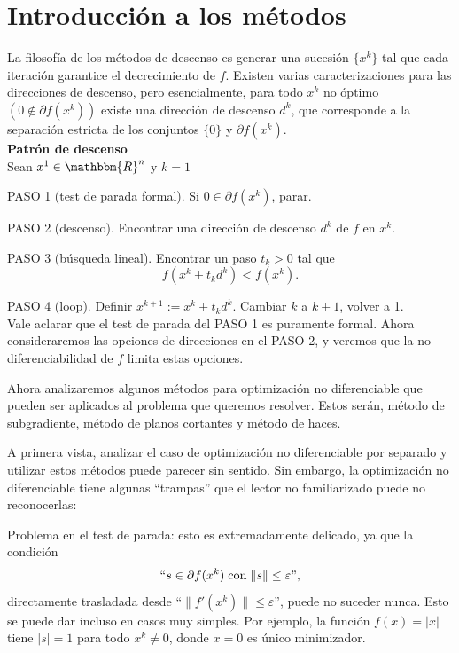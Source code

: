 \documentclass[a4paper,12pt]{report}
\newcommand{\RR}{\mathbbm{R}}
\newcommand{\Rn}{\RR^n}
\newcommand{\vep}{\varepsilon}
\newcounter{ejemplo}
\begin{document}
\section{Introducci\'on a los m\'etodos}
La filosof\'ia de los m\'etodos de descenso es generar una sucesi\'on $\{x^k\}$ tal que cada iteraci\'on garantice el decrecimiento de $f$. Existen varias caracterizaciones para las direcciones de descenso, pero esencialmente, para todo $x^k$ no \'optimo $(0\notin\partial f(x^k))$ existe una direcci\'on de descenso $d^k$, que corresponde a la separaci\'on estricta de los conjuntos $\{0\}$ y $\partial f(x^k).$\\


\textbf{Patr\'on de descenso}\\ Sean $x^1\in\Rn$ y $k=1$

PASO 1 (test de parada formal). Si $0\in\partial f(x^k)$, parar.

PASO 2 (descenso). Encontrar una direcci\'on de descenso $d^k$ de $f$ en $x^k$.

PASO 3 (b\'usqueda lineal). Encontrar un paso $t_k>0$ tal que $$f(x^k+t_k d^k)<f(x^k).$$

PASO 4 (loop). Definir $x^{k+1}:=x^k+t_k d^k$. Cambiar $k$ a $k+1$, volver a 1.\\

Vale aclarar que el test de parada del PASO 1 es puramente formal.
Ahora consideraremos las opciones de direcciones en el PASO 2, y veremos que la no diferenciabilidad de $f$ limita estas opciones.

Ahora analizaremos algunos m\'etodos para optimizaci\'on no diferenciable que pueden ser aplicados al problema que queremos resolver. Estos ser\'an, m\'etodo de subgradiente, m\'etodo de planos cortantes y m\'etodo de haces.

A primera vista, analizar el caso de optimizaci\'on no diferenciable por separado y utilizar estos m\'etodos puede parecer sin sentido. Sin embargo, la optimizaci\'on no diferenciable tiene algunas ``trampas'' que el lector no familiarizado puede no reconocerlas:

\textbullet  Problema en el test de parada: esto es extremadamente delicado, ya que la condici\'on $$``s\in\partial f(x^k)\;\mbox{con}\;\|s\|\leq\vep ",$$ directamente trasladada desde ``$\|f'(x^k)\|\leq \vep$'', puede no suceder nunca. Esto se puede dar incluso en casos muy simples. Por ejemplo, la funci\'on $f(x)=|x|$ tiene $|s|=1$ para todo $x^k\neq 0$, donde $x=0$ es \'unico minimizador.
\end{document}
